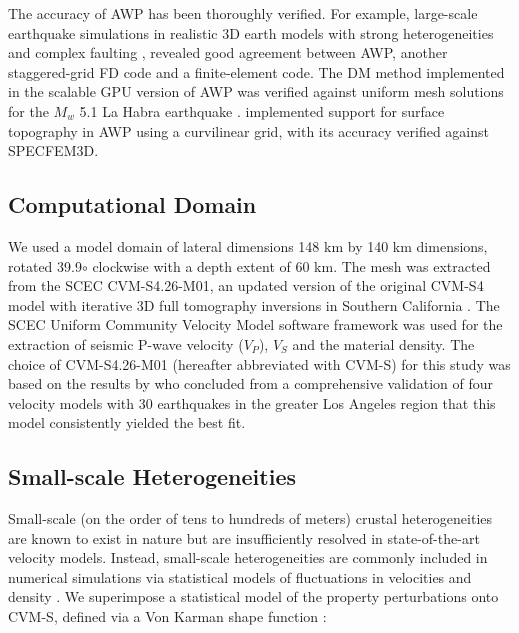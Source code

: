 The accuracy of AWP has been thoroughly verified. For example, large-scale earthquake simulations in realistic 3D earth models with strong heterogeneities and complex faulting \citep{bielakShakeOutEarthquakeScenario2010,bielak2016verification}, revealed good agreement between AWP, another staggered-grid FD code and a finite-element code. The DM method implemented in the scalable GPU version of AWP was verified against uniform mesh solutions for the $M_w$ 5.1 La Habra earthquake \citep{rotenHighfrequencyNonlinearEarthquake2018}. \citet{oreillyHighorderFiniteDifference2021} implemented support for surface topography in AWP using a curvilinear grid, with its accuracy verified against SPECFEM3D.

\subsection{Computational Domain}
We used a model domain of lateral dimensions 148 km by 140 km dimensions, rotated 39.9$\circ$ clockwise with a depth extent of 60 km. The mesh was extracted from the SCEC CVM-S4.26-M01, an updated version of the original CVM-S4 model \citep{magistraleSCECSouthernCalifornia2000,kohlerMantleHeterogeneitiesSCEC2003} with iterative 3D full tomography inversions in Southern California \citep{leeRapidFullwaveCentroid2011}. The SCEC Uniform Community Velocity Model software framework \citep[V19.4][]{smallSCECUnifiedCommunity2017} was used for the extraction of seismic P-wave velocity ($V_P$), $V_S$ and the material density. The choice of CVM-S4.26-M01 (hereafter abbreviated with CVM-S) for this study was based on the results by \citet{tabordaEvaluationSouthernCalifornia2016} who concluded from a comprehensive validation of four velocity models with 30 earthquakes in the greater Los Angeles region that this model consistently yielded the best fit.

\subsection{Small-scale Heterogeneities}
Small-scale (on the order of tens to hundreds of meters) crustal heterogeneities are known to exist in nature but are insufficiently resolved in state-of-the-art velocity models. Instead, small-scale heterogeneities are commonly included in numerical simulations via statistical models of fluctuations in velocities and density . We superimpose a statistical model of the property perturbations onto CVM-S, defined via a Von Karman shape function \citep{frankelFiniteDifferenceSimulations1986}:

